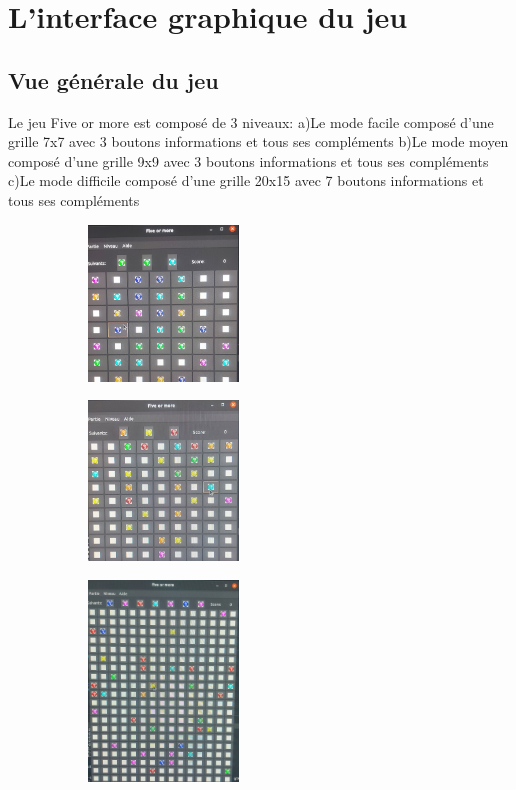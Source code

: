 \documentclass[a4paper, 11pt, oneside]{article}
\begin{document}
\section{L’interface graphique du jeu}
\subsection{Vue générale du jeu}
Le jeu Five or more est composé de 3 niveaux:
\newline
a)Le mode facile composé d'une grille 7x7 avec 3 boutons informations et tous ses compléments
\newline
b)Le mode moyen composé d'une grille 9x9 avec 3 boutons informations et tous ses compléments
\newline
c)Le mode difficile composé d'une grille 20x15 avec 7 boutons informations et tous ses compléments
\newline
\begin{figure}[!h]
    \centering
    \begin{subfigure}[]{}
        \includegraphics[width=4cm]{./images/facile.jpg}
    \end{subfigure}
    \begin{subfigure}[]{}
        \includegraphics[width=4cm]{./images/moyen.jpg}
    \end{subfigure}
    \begin{subfigure}[]{}
        \includegraphics[width=4cm]{./images/difficile.jpg}
    \end{subfigure}

\end{figure}
\end{document}
